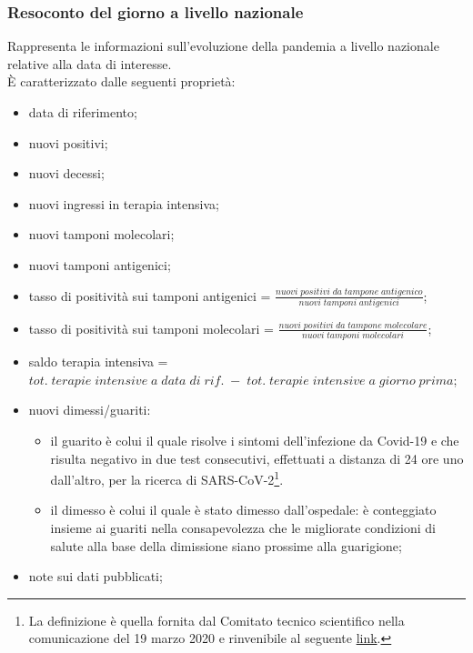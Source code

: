 \subsubsection{Resoconto del giorno a livello nazionale}
\label{sss:resoconto-del-giorno-livello-nazionale}
Rappresenta le informazioni sull'evoluzione della pandemia a livello nazionale relative alla data di interesse.\\
È caratterizzato dalle seguenti proprietà:
\begin{itemize}
    \item data di riferimento;
    \item nuovi positivi;
    \item nuovi decessi;
    \item nuovi ingressi in terapia intensiva;
    \item nuovi tamponi molecolari;
    \item nuovi tamponi antigenici;
    \item tasso di positività sui tamponi antigenici = $\frac{nuovi \; positivi \; da \; tampone \; antigenico}{nuovi \; tamponi \; antigenici}$;
    \item tasso di positività sui tamponi molecolari = $\frac{nuovi \; positivi \; da \; tampone \; molecolare}{nuovi \; tamponi \; molecolari}$;
    \item saldo terapia intensiva = $tot. \; terapie \; intensive \; a \; data \; di \; rif. \; - \; tot. \; terapie \; intensive \; a \; giorno \; prima$;
    \item nuovi dimessi/guariti:
    \begin{itemize}
        \item il guarito è colui il quale risolve i sintomi dell’infezione da Covid-19 e che risulta negativo in due test consecutivi, effettuati a distanza di 24 ore uno dall’altro, per la ricerca di SARS-CoV-2\footnote{La definizione è quella fornita dal Comitato tecnico scientifico nella comunicazione del 19 marzo 2020 e rinvenibile al seguente \href{http://www.salute.gov.it/portale/nuovocoronavirus/dettaglioNotizieNuovoCoronavirus.jsp?lingua=italiano&menu=notizie&p=dalministero&id=4274}{link}.}.
        \item il dimesso è colui il quale è stato dimesso dall'ospedale: è conteggiato insieme ai guariti nella consapevolezza che le migliorate condizioni di salute alla base della dimissione siano prossime alla guarigione;
    \end{itemize}
    \item note sui dati pubblicati;
\end{itemize}
